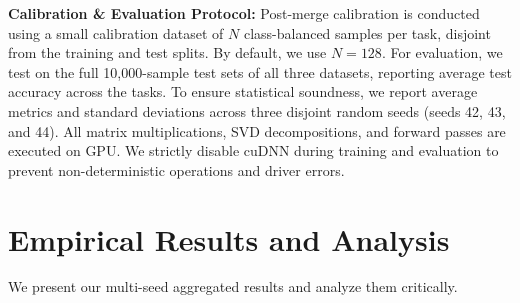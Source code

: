 \documentclass{article}
\theoremstyle{plain}
\theoremstyle{definition}
\theoremstyle{remark}
\begin{document}
\textbf{Calibration \& Evaluation Protocol:} Post-merge calibration is conducted using a small calibration dataset of $N$ class-balanced samples per task, disjoint from the training and test splits. By default, we use $N = 128$. For evaluation, we test on the full 10,000-sample test sets of all three datasets, reporting average test accuracy across the tasks. To ensure statistical soundness, we report average metrics and standard deviations across three disjoint random seeds (seeds 42, 43, and 44). All matrix multiplications, SVD decompositions, and forward passes are executed on GPU. We strictly disable cuDNN during training and evaluation to prevent non-deterministic operations and driver errors.

\section{Empirical Results and Analysis}
\label{sec:results}

We present our multi-seed aggregated results and analyze them critically.
\end{document}
